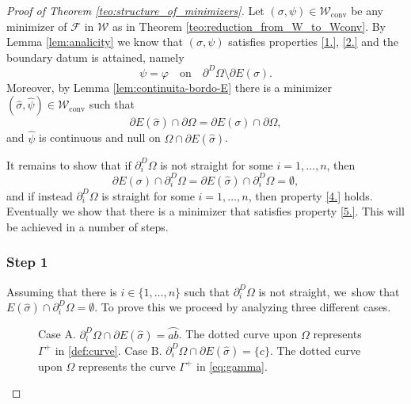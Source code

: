 \documentclass[JEP,XML,SOM,Unicode, NoFloatCountersInSection,published]{cedram}
\let\arc\wideparen
\let\Om\Omega
\newcommand\admclassconv{{\mathcal W_\mathrm{conv}}}
\theoremstyle{definition}
\begin{document}
\begin{proof}[Proof of Theorem \ref{teo:structure_of_minimizers}]
Let $(\sigma,\psi)\in\admclassconv$ be any minimizer of $\mathcal F$ in $\mathcal W$ as in Theorem \ref{teo:reduction_from_W_to_Wconv}.
By Lemma \ref{lem:analicity} we know that $(\sigma,\psi)$ satisfies properties \ref{1.}, \ref{2.} and the boundary datum is attained, namely
\begin{equation*}
\psi=\varphi\quad\text{on}\quad\partial^D\Om\setminus\partial E(\sigma).
\end{equation*}
Moreover, by Lemma \ref{lem:continuita-bordo-E} there is a minimizer $(\widehat\sigma,\widehat\psi)\in\admclassconv$ such that
\begin{equation}\label{eq:prop1}
\partial E(\widehat{\sigma})\cap\partial\Om= \partial E(\sigma)\cap\partial\Om,
\end{equation}
and $\widehat\psi$ is continuous and null on $\Om\cap\partial E(\widehat\sigma)$.

It remains to show that if $\partial^D_i\Om$ is not straight for some $i=1,
\dots,n$, then
\[
\partial E(\sigma)\cap\partial^D_i\Om=\partial E(\widehat\sigma)\cap\partial^D_i\Om=\emptyset,
\]
and if instead $\partial^D_i\Om$ is straight for some $i=1,\dots,n$, then property \ref{4.} holds.
Eventually we show that there is a minimizer that satisfies property \ref{5.}.
This will be achieved in a number of steps.

\subsubsection*{Step 1} Assuming that there is $i\in\{1,\dots,n\}$ such that $\partial_i^D\Om$ is not straight, we~show that $E(\widehat\sigma)\cap\partial_i^D\Om=\emptyset$. To prove this we proceed by analyzing three different cases.

\begin{figure}
\centering
\def\svgwidth{0.9\textwidth}

\caption{Case A. $\partial_i^D\Omega\cap\partial E(\hat\sigma)=\arc{ab}$. The
dotted curve upon $\Om$ represents $\Gamma^+$ in \eqref{def:curve}.
Case B. $\partial_i^D\Omega\cap\partial E(\hat\sigma)=\{c\}$. The dotted curve upon $\Om$ represents the curve $\Gamma^+$ in \eqref{eq:gamma}.
}\label{caseA-caseB}
\end{figure}


\end{proof}
\end{document}

